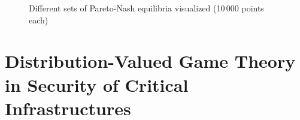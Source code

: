 \documentclass[a4paper]{scrreprt}
\begin{document}
\begin{figure}[h]
%        
%        
        \label{fig:paretoNashEquilibriaShowcase}
        \caption{Different sets of Pareto-Nash equilibria visualized (10\,000 points each)}
    \end{figure}
    
    
    \chapter{Distribution-Valued Game Theory in Security of Critical Infrastructures}
    
    \printbibliography
\end{document}
